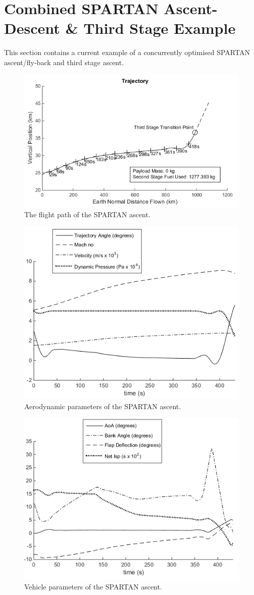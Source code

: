 \section{Combined SPARTAN Ascent-Descent \& Third Stage Example}

This section contains a current example of a concurrently optimised SPARTAN ascent/fly-back and third stage ascent. 

\begin{figure}[H]
	\centering
	\includegraphics[width=0.9\linewidth]{figures/7_Full/Ascent}
	\caption{The flight path of the SPARTAN ascent.}
	\label{fig:ascent}
\end{figure}
\begin{figure}[H]
	\centering
	\includegraphics[width=0.7\linewidth]{figures/7_Full/Ascent-Aero}
	\caption{Aerodynamic parameters of the SPARTAN ascent.}
	\label{fig:ascent-aero}
\end{figure}
\begin{figure}[H]
	\centering
	\includegraphics[width=0.7\linewidth]{figures/7_Full/Ascent-Vehicle}
	\caption{Vehicle parameters of the SPARTAN ascent.}
	\label{fig:ascent-vehicle}
\end{figure}
